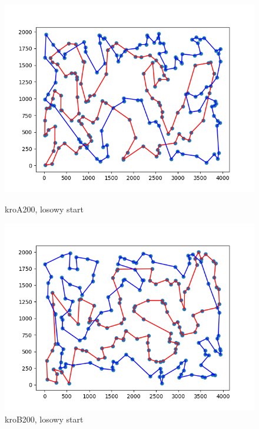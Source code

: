 \documentclass[11pt]{article}
\begin{document}
\begin{figure}[H]
    \begin{minipage}[t]{0.45\textwidth}
        \centering
        \includegraphics[width=\linewidth]{best_paths/kroA200/traverse_steepest_edge}
        \caption{kroA200, losowy start}
    \end{minipage}
    \hfill
    \begin{minipage}[t]{0.45\textwidth}
        \centering
        \includegraphics[width=\linewidth]{best_paths/kroB200/traverse_steepest_edge}
        \caption{kroB200, losowy start}
    \end{minipage}\label{fig:figure1}
\end{figure}
\end{document}
